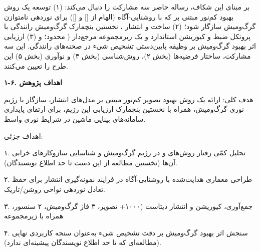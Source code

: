 \documentclass[12pt,a4paper]{article}
\begin{document}
بر مبنای این شکاف، رساله حاضر سه مشارکت را دنبال می‌کند: (۱) توسعه یک روش بهبود کم‌نور  مبتنی بر  که با  روشنایی-آگاه (الهام از [] و []) برای نوردهی نامتوازن گرگ‌ومیش سازگار شود؛ (۲) ساخت و انتشار ، نخستین بنچمارک  گرگ‌ومیش رانندگی با پروتکل ضبط و کیوریشن استاندارد و یک زیرمجموعه مرجع‌دار ( محدود؛ و (۳) ارزیابی اثر بهبود گرگ‌ومیش بر وظیفه پایین‌دستی تشخیص شیء در صحنه‌های رانندگی. این سه مشارکت، ساختار فرضیه‌ها (بخش ۲)، روش‌شناسی (بخش ۴) و نوآوری (بخش ۵) این طرح را تعیین می‌کنند.\par
\textbf{۱-۶. اهداف پژوهش}\par
هدف کلی: ارائه یک روش بهبود تصویر کم‌نور  مبتنی بر  مدل‌های انتشار، سازگار با رژیم نوری گرگ‌ومیش، همراه با نخستین بنچمارک ارزیابی این رژیم، برای ارتقای پایداری سامانه‌های بینایی ماشین در شرایط نوری واسط.\par
اهداف جزئی:\par
۱. تحلیل کمّی رفتار روش‌های   و  در رژیم گرگ‌ومیش و شناسایی سازوکارهای خرابی آن‌ها (نخستین مطالعه از این دست تا حد اطلاع نویسندگان).\par
۲. طراحی معماری هدایت‌شده با  روشنایی-آگاه در فرایند نمونه‌گیری انتشار برای حفظ تعادل نوردهی نواحی روشن/تاریک.\par
۳. جمع‌آوری، کیوریشن و انتشار دیتاست  (۱۰۰۰+ تصویر، ۳ فاز گرگ‌ومیش، ۲ سنسور، همراه با زیرمجموعه \par
۴. سنجش اثر بهبود گرگ‌ومیش بر دقت تشخیص شیء به‌عنوان سنجه کاربردی نهایی (مطالعه‌ای که تا حد اطلاع نویسندگان پیشینه‌ای ندارد).\par
\end{document}
